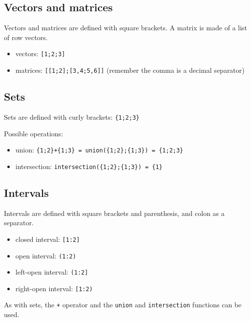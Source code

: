 \subsection{Vectors and matrices}
Vectors and matrices are defined with square brackets. A matrix is made of a list of row vectors.
\begin{itemize}
\item vectors: \texttt{[1;2;3]}
\item matrices: \texttt{[[1;2];[3,4;5,6]]}
(remember the comma is a decimal separator)
\end{itemize}

\subsection{Sets}
Sets are defined with curly brackets: \texttt{\{1;2;3\}}

Possible operations:
\begin{itemize}
\item union: \texttt{\{1;2\}+\{1;3\} = union(\{1;2\};\{1;3\}) = \{1;2;3\}}
\item intersection: \texttt{intersection(\{1;2\};\{1;3\}) = \{1\}}
\end{itemize}

\subsection{Intervals}
Intervals are defined with square brackets and parenthesis, and colon as a separator.
\begin{itemize}
\item closed interval: \texttt{[1:2]}
\item open interval: \texttt{(1:2)}
\item left-open interval: \texttt{(1:2]}
\item right-open interval: \texttt{[1:2)}
\end{itemize}
As with sets, the \texttt{+} operator and the \texttt{union} and \texttt{intersection} functions can be used.
